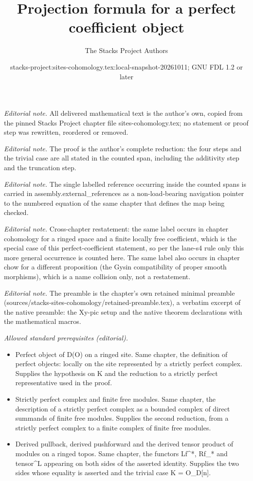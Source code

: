 \documentclass[10pt,a4paper]{amsart}
\title{Projection formula for a perfect coefficient object}
\author{The Stacks Project Authors}
\date{stacks-project:sites-cohomology.tex:local-snapshot-20261011; GNU FDL 1.2 or later}
\theoremstyle{plain}
\theoremstyle{definition}
\theoremstyle{remark}
\numberwithin{equation}{subsection}
\begin{document}
\maketitle
\noindent\textit{Editorial note.} All delivered mathematical text is the author's own, copied from the pinned Stacks Project chapter file sites-cohomology.tex; no statement or proof step was rewritten, reordered or removed.\par\medskip
\noindent\textit{Editorial note.} The proof is the author's complete reduction: the four steps and the trivial case are all stated in the counted span, including the additivity step and the truncation step.\par\medskip
\noindent\textit{Editorial note.} The single labelled reference occurring inside the counted spans is carried in assembly.external\_references as a non-load-bearing navigation pointer to the numbered equation of the same chapter that defines the map being checked.\par\medskip
\noindent\textit{Editorial note.} Cross-chapter restatement: the same label occurs in chapter cohomology for a ringed space and a finite locally free coefficient, which is the special case of this perfect-coefficient statement, so per the lane-s4 rule only this more general occurrence is counted here. The same label also occurs in chapter chow for a different proposition (the Gysin compatibility of proper smooth morphisms), which is a name collision only, not a restatement.\par\medskip
\noindent\textit{Editorial note.} The preamble is the chapter's own retained minimal preamble (sources/stacks-sites-cohomology/retained-preamble.tex), a verbatim excerpt of the native preamble: the Xy-pic setup and the native theorem declarations with the mathematical macros.\par\medskip
\noindent\textit{Allowed standard prerequisites (editorial).}\begin{itemize}
\item Perfect object of D(O) on a ringed site. Same chapter, the definition of perfect objects: locally on the site represented by a strictly perfect complex. Supplies the hypothesis on K and the reduction to a strictly perfect representative used in the proof.
\item Strictly perfect complex and finite free modules. Same chapter, the description of a strictly perfect complex as a bounded complex of direct summands of finite free modules. Supplies the second reduction, from a strictly perfect complex to a finite complex of finite free modules.
\item Derived pullback, derived pushforward and the derived tensor product of modules on a ringed topos. Same chapter, the functors Lf\textasciicircum{}*, Rf\_* and tensor\textasciicircum{}L appearing on both sides of the asserted identity. Supplies the two sides whose equality is asserted and the trivial case K = O\_D[n].
\end{itemize}\medskip
\end{document}
